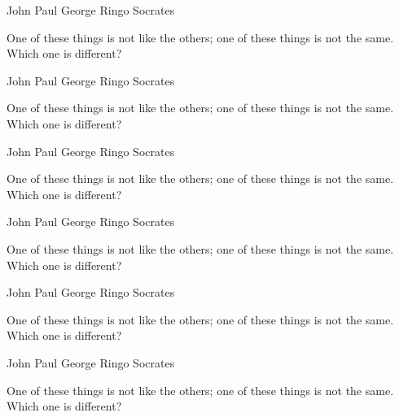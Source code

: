\documentclass[answers,addpoints]{exam}
\begin{document}
\begin{questions}
\begin{oneparchoices}
\choice John
\choice Paul
\choice George
\choice Ringo
\CorrectChoice Socrates
\end{oneparchoices}

\question[5]
One of these things is not like the others; one of these
things is not the same. Which one is different?

\begin{randomizechoices}
\choice John
\choice Paul
\choice George
\choice Ringo
\CorrectChoice Socrates
\end{randomizechoices}

\question[5]
One of these things is not like the others; one of these
things is not the same. Which one is different?

\begin{randomizechoices}
\choice John
\choice Paul
\choice George
\choice Ringo
\CorrectChoice Socrates
\end{randomizechoices}

\question[5]
One of these things is not like the others; one of these
things is not the same. Which one is different?

\begin{choices}
\choice John
\choice Paul
\choice George
\choice Ringo
\CorrectChoice Socrates
\end{choices}

\question[5]
One of these things is not like the others; one of these
things is not the same. Which one is different?

\begin{randomizeoneparchoices}
\choice John
\choice Paul
\choice George
\choice Ringo
\CorrectChoice Socrates
\end{randomizeoneparchoices}

\question[5]
One of these things is not like the others; one of these
things is not the same. Which one is different?

\begin{oneparchoices}
\choice John
\choice Paul
\choice George
\choice Ringo
\CorrectChoice Socrates
\end{oneparchoices}

\question[5]
One of these things is not like the others; one of these
things is not the same. Which one is different?


\end{questions}
\end{document}
